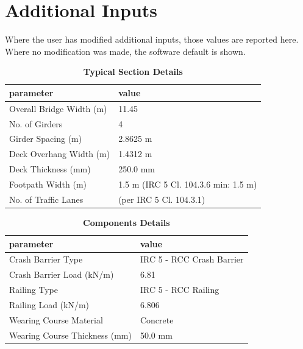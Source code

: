 \documentclass[12pt,a4paper]{report}
\numberwithin{table}{chapter}
\numberwithin{figure}{chapter}
\begin{document}
\newpage
\section{Additional Inputs}
\label{sec:additional-inputs}

Where the user has modified additional inputs, those values are reported here. Where no modification was made, the software default is shown.

\vspace{0.8cm}

\begin{longtable}{|L{5.5cm}|p{10.0cm}|}
\caption{\textbf{Typical Section Details}}
\hline
\textbf{parameter} & \textbf{value} \\
\hline
\textnormal{Overall Bridge Width (m)} & 11.45 \\[6pt]
\hline
\textnormal{No. of Girders} & 4 \\[6pt]
\hline
\textnormal{Girder Spacing (m)} & 2.8625 m \\[6pt]
\hline
\textnormal{Deck Overhang Width (m)} & 1.4312 m \\[6pt]
\hline
\textnormal{Deck Thickness (mm)} & 250.0 mm \\[6pt]
\hline
\textnormal{Footpath Width (m)} & 1.5 m (IRC 5 Cl. 104.3.6 min: 1.5 m) \\[6pt]
\hline
\textnormal{No. of Traffic Lanes} &  (per IRC 5 Cl. 104.3.1) \\[6pt]
\hline
\end{longtable}

\vspace{0.8em}

\begin{longtable}{|L{5.5cm}|p{10.0cm}|}
\caption{\textbf{Components Details}}
\hline
\textbf{parameter} & \textbf{value} \\
\hline
\textnormal{Crash Barrier Type} & IRC 5 - RCC Crash Barrier \\[6pt]
\hline
\textnormal{Crash Barrier Load (kN/m)} & 6.81 \\[6pt]
\hline

\textnormal{Railing Type} & IRC 5 - RCC Railing \\[6pt]
\hline
\textnormal{Railing Load (kN/m)} & 6.806 \\[6pt]
\hline
\textnormal{Wearing Course Material} & Concrete \\[6pt]
\hline
\textnormal{Wearing Course Thickness (mm)} & 50.0 mm \\[6pt]
\hline
\end{longtable}
\end{document}
